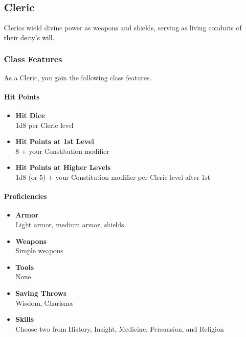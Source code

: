 \subsection{Cleric}\label{Cleric_cleric}

Clerics wield divine power as weapons and shields, serving as living
conduits of their deity's will.

\subsubsection{Class Features}\label{Cleric_class-features}

As a Cleric, you gain the following class features.

\paragraph{Hit Points}\label{Cleric_hit-points}

\begin{itemize}
\item
  \textbf{Hit Dice}\\
  1d8 per Cleric level
\item
  \textbf{Hit Points at 1st Level}\\
  8 + your Constitution modifier
\item
  \textbf{Hit Points at Higher Levels}\\
  1d8 (or 5) + your Constitution modifier per Cleric level after 1st
\end{itemize}

\paragraph{Proficiencies}\label{Cleric_proficiencies}

\begin{itemize}
\item
  \textbf{Armor}\\
  Light armor, medium armor, shields
\item
  \textbf{Weapons}\\
  Simple weapons
\item
  \textbf{Tools}\\
  None
\item
  \textbf{Saving Throws}\\
  Wisdom, Charisma
\item
  \textbf{Skills}\\
  Choose two from History, Insight, Medicine, Persuasion, and Religion
\end{itemize}

